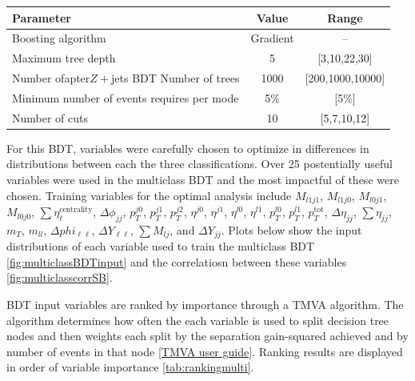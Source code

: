 \begin{table}[h!]
\centering
\begin{tabular}{|l|c|c|}
\hline
Parameter                                    & Value    & Range     \\
\hline
Boosting algorithm                           & Gradient & --        \\
Maximum tree depth                           &  5       & [3,10,22,30]    \\
Number ofapter{$Z+$jets BDT}
Number of trees                              &  1000    & [200,1000,10000] \\
Minimum number of events requires per mode   &  5\%     & [5\%]\\
Number of cuts                               &  10       & [5,7,10,12]  \\
\hline
\end{tabular}
\label{tab:multiBDTparameters}
\end{table}

For this BDT, variables were carefully chosen to optimize in differences in distributions between each the three classifications. Over 25 postentially useful variables were used in the multiclass BDT and the most impactful of these were chosen. Training variables for the optimal analysis include $M_{l1j1}$, $M_{l1j0}$, $M_{l0j1}$, $M_{l0j0}$, $\sum \eta_\ell^{\mathrm{centrality}}$, $\Delta \phi_{jj}$, $p_T^{j0}$, $p_T^{j1}$, $p_T^{j2}$, $\eta^{j0}$, $\eta^{j1}$, $\eta^{l0}$, $\eta^{l1}$, $p_T^{l0}$, $p_T^{l1}$, $p_T^{\text{tot}}$, $\Delta \eta_{jj}$, $\sum \eta_{jj}$, $m_T$, $m_{ll}$, $\Delta phi_{\ell\ell}$, $\Delta Y_{\ell\ell}$, $\sum M_{lj}$, and $\Delta Y_{jj}$. Plots below show the input distributions of each variable used to train the multiclass BDT \ref{fig:multiclassBDTinput} and the correlatiosn between these variables \ref{fig:multiclasscorrSB}.

BDT input variables are ranked by importance through a TMVA algorithm. The algorithm determines how often the each variable is used to split decision tree nodes and then weights each split by the separation gain-squared achieved and by number of events in that node \ref{TMVA user guide}. Ranking results are displayed in order of variable importance \ref{tab:rankingmulti}.

